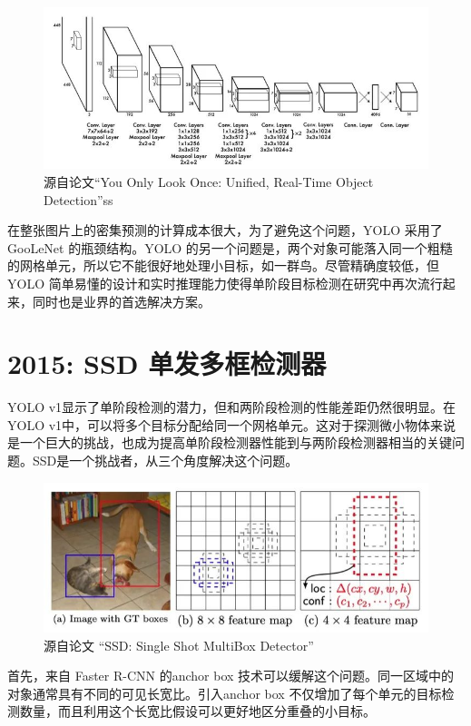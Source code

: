 \documentclass{article}
\begin{document}
	   	\begin{figure}[htpb]
	   		\centering
	   		\includegraphics[width=\linewidth]{detectfig/6.jpg}
	   		\caption{源自论文“You Only Look Once: Unified, Real-Time Object Detection”ss}
	   	\end{figure}
	   	
	   	
	   	在整张图片上的密集预测的计算成本很大，为了避免这个问题，YOLO 采用了 GooLeNet 的瓶颈结构。YOLO 的另一个问题是，两个对象可能落入同一个粗糙的网格单元，所以它不能很好地处理小目标，如一群鸟。尽管精确度较低，但 YOLO 简单易懂的设计和实时推理能力使得单阶段目标检测在研究中再次流行起来，同时也是业界的首选解决方案。
	   	
	   	\section{2015: SSD  单发多框检测器} 
	   	YOLO v1显示了单阶段检测的潜力，但和两阶段检测的性能差距仍然很明显。在 YOLO v1中，可以将多个目标分配给同一个网格单元。这对于探测微小物体来说是一个巨大的挑战，也成为提高单阶段检测器性能到与两阶段检测器相当的关键问题。SSD是一个挑战者，从三个角度解决这个问题。
	   	
	   	\begin{figure}[htpb]
	   		\centering
	   		\includegraphics[width=\linewidth]{detectfig/7.jpg}
	   		\caption{源自论文 “SSD: Single Shot MultiBox Detector”}
	   	\end{figure}
   	
	   	首先，来自 Faster R-CNN 的anchor box 技术可以缓解这个问题。同一区域中的对象通常具有不同的可见长宽比。引入anchor box 不仅增加了每个单元的目标检测数量，而且利用这个长宽比假设可以更好地区分重叠的小目标。
	   	
\end{document}
